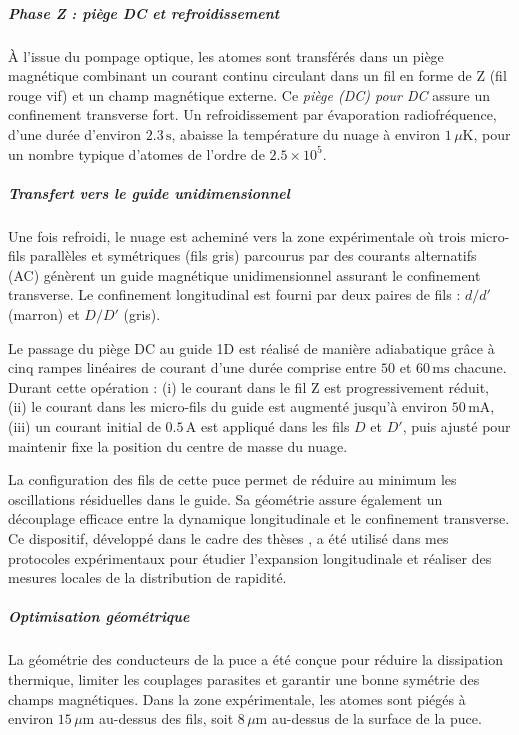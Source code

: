 \subparagraph{Phase Z : piège DC et refroidissement}
À l’issue du pompage optique, les atomes sont transférés dans un piège magnétique combinant un courant continu circulant dans un fil en forme de Z (fil rouge vif) et un champ magnétique externe. Ce \emph{piège (\acrshort{DC}) pour \acrlong{DC}} assure un confinement transverse fort. Un refroidissement par évaporation radiofréquence, d’une durée d’environ \(2.3\,\mathrm{s}\), abaisse la température du nuage à environ \(1\,\mu\mathrm{K}\), pour un nombre typique d’atomes de l’ordre de \(2.5\times 10^5\).


\subparagraph{Transfert vers le guide unidimensionnel}
Une fois refroidi, le nuage est acheminé vers la zone expérimentale où trois micro-fils parallèles et symétriques (fils gris) parcourus par des courants alternatifs (\gls{AC}) génèrent un guide magnétique unidimensionnel assurant le confinement transverse. Le confinement longitudinal est fourni par deux paires de fils : $d/d'$ (marron) et $D/D'$ (gris).

\medskip

Le passage du piège \gls{DC} au guide 1D est réalisé de manière adiabatique grâce à cinq rampes linéaires de courant d’une durée comprise entre \(50\) et \(60\,\mathrm{ms}\) chacune. Durant cette opération :  
(i) le courant dans le fil Z est progressivement réduit,  
(ii) le courant dans les micro-fils du guide est augmenté jusqu’à environ \(50\,\mathrm{mA}\),  
(iii) un courant initial de \(0.5\,\mathrm{A}\) est appliqué dans les fils $D$ et $D'$, puis ajusté pour maintenir fixe la position du centre de masse du nuage.  

\medskip


La configuration des fils de cette puce permet de réduire au minimum les oscillations résiduelles dans le guide. Sa géométrie assure également un découplage efficace entre la dynamique longitudinale et le confinement transverse. Ce dispositif, développé dans le cadre des thèses \cite{Fang2014,schem2019,L.Dubois2024}, a été utilisé dans mes protocoles expérimentaux pour étudier l’expansion longitudinale et réaliser des mesures locales de la distribution de rapidité.


\subparagraph{Optimisation géométrique}
La géométrie des conducteurs de la puce a été conçue pour réduire la dissipation thermique, limiter les couplages parasites et garantir une bonne symétrie des champs magnétiques. Dans la zone expérimentale, les atomes sont piégés à environ \(15\,\mu\mathrm{m}\) au-dessus des fils, soit \(8\,\mu\mathrm{m}\) au-dessus de la surface de la puce.


